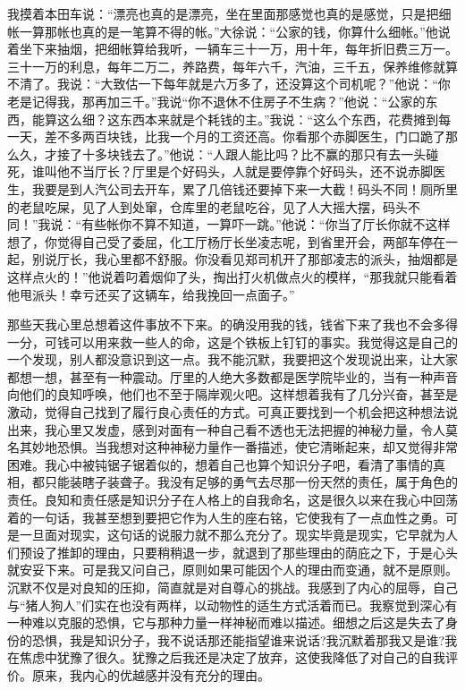 \documentclass[12pt,oneside]{book}
\begin{document}
我摸着本田车说：``漂亮也真的是漂亮，坐在里面那感觉也真的是感觉，只是把细帐一算那帐也真的是一笔算不得的帐。''大徐说：``公家的钱，你算什么细帐。''他说着坐下来抽烟，把细帐算给我听，一辆车三十一万，用十年，每年折旧费三万一。三十一万的利息，每年二万二，养路费，每年六千，汽油，三千五，保养维修就算不清了。我说：``大致估一下每年就是六万多了，还没算这个司机呢？''他说：``你老是记得我，那再加三千。''我说``你不退休不住房子不生病？''他说：``公家的东西，能算这么细？这东西本来就是个耗钱的主。''我说：``这么个东西，花费摊到每一天，差不多两百块钱，比我一个月的工资还高。你看那个赤脚医生，门口跪了那么久，才接了十多块钱去了。''他说：``人跟人能比吗？比不赢的那只有去一头碰死，谁叫他不当厅长？厅里是个好码头，人就是要停靠个好码头，还不说赤脚医生，我要是到人汽公司去开车，累了几倍钱还要掉下来一大截！码头不同！厕所里的老鼠吃屎，见了人到处窜，仓库里的老鼠吃谷，见了人大摇大摆，码头不同！''我说：``有些帐你不算不知道，一算吓一跳。''他说：``你当了厅长你就不这样想了，你觉得自己受了委屈，化工厅杨厅长坐凌志呢，到省里开会，两部车停在一起，别说厅长，我心里都不舒服。你没看见郑司机开了那部凌志的派头，抽烟都是这样点火的！''他说着叼着烟仰了头，掏出打火机做点火的模样，``那我就只能看着他甩派头！幸亏还买了这辆车，给我挽回一点面子。''

那些天我心里总想着这件事放不下来。的确没用我的钱，钱省下来了我也不会多得一分，可钱可以用来救一些人的命，这是个铁板上钉钉的事实。我觉得这是自己的一个发现，别人都没意识到这一点。我不能沉默，我要把这个发现说出来，让大家都想一想，甚至有一种震动。厅里的人绝大多数都是医学院毕业的，当有一种声音向他们的良知呼唤，他们也不至于隔岸观火吧。这样想着我有了几分兴奋，甚至是激动，觉得自己找到了履行良心责任的方式。可真正要找到一个机会把这种想法说出来，我心里又发虚，感到对面有一种自己看不透也无法把握的神秘力量，令人莫名其妙地恐惧。当我想对这种神秘力量作一番描述，使它清晰起来，却又觉得非常困难。我心中被钝锯子锯着似的，想着自己也算个知识分子吧，看清了事情的真相，都只能装瞎子装聋子。我没有足够的勇气去尽那一份天然的责任，属于角色的责任。良知和责任感是知识分子在人格上的自我命名，这是很久以来在我心中回荡着的一句话，我甚至想到要把它作为人生的座右铭，它使我有了一点血性之勇。可是一旦面对现实，这句话的说服力就不那么充分了。现实毕竟是现实，它早就为人们预设了推卸的理由，只要稍稍退一步，就退到了那些理由的荫庇之下，于是心头就安妥下来。可是我又问自己，原则如果可能因个人的理由而变通，就不是原则。沉默不仅是对良知的压抑，简直就是对自尊心的挑战。我感到了内心的屈辱，自己与``猪人狗人''们实在也没有两样，以动物性的适生方式活着而已。我察觉到深心有一种难以克服的恐惧，它与那种力量一样神秘而难以描述。细想之后这是失去了身份的恐惧，我是知识分子，我不说话那还能指望谁来说话?我沉默着那我又是谁?我在焦虑中犹豫了很久。犹豫之后我还是决定了放弃，这使我降低了对自己的自我评价。原来，我内心的优越感并没有充分的理由。
\end{document}
